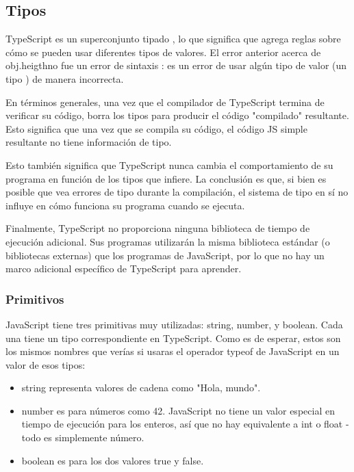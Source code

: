 \begin{enumerate}
\subsection{Tipos}

TypeScript es un superconjunto tipado , lo que significa que agrega reglas sobre cómo se pueden usar diferentes tipos de valores. El error anterior acerca de obj.heigthno fue un error de sintaxis : es un error de usar algún tipo de valor (un tipo ) de manera incorrecta.

En términos generales, una vez que el compilador de TypeScript termina de verificar su código, borra los tipos para producir el código "compilado" resultante. Esto significa que una vez que se compila su código, el código JS simple resultante no tiene información de tipo.

Esto también significa que TypeScript nunca cambia el comportamiento de su programa en función de los tipos que infiere. La conclusión es que, si bien es posible que vea errores de tipo durante la compilación, el sistema de tipo en sí no influye en cómo funciona su programa cuando se ejecuta.

Finalmente, TypeScript no proporciona ninguna biblioteca de tiempo de ejecución adicional. Sus programas utilizarán la misma biblioteca estándar (o bibliotecas externas) que los programas de JavaScript, por lo que no hay un marco adicional específico de TypeScript para aprender.

\subsubsection{Primitivos}

JavaScript tiene tres primitivas muy utilizadas: string, number, y boolean. Cada una tiene un tipo correspondiente en TypeScript. Como es de esperar, estos son los mismos nombres que verías si usaras el operador typeof de JavaScript en un valor de esos tipos:

\begin{itemize}
	\item string representa valores de cadena como "Hola, mundo".
	\item number es para números como 42. JavaScript no tiene un valor especial en tiempo de ejecución para los enteros, así que no hay equivalente a int o float - todo es simplemente número.
	\item boolean es para los dos valores true y false.
\end{itemize}



\end{enumerate}
